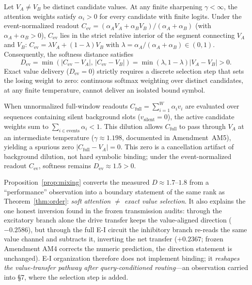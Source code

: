 \begin{proposition}
\label{prop:mixing}
Let $V_A \neq V_B$ be distinct candidate values. At any finite sharpening $\gamma<\infty$,
the attention weights satisfy $\alpha_i>0$ for every candidate with finite logits.
Under the event-normalized readout $C_{\mathrm{ev}} = (\alpha_A V_A + \alpha_B V_B)/(\alpha_A + \alpha_B)$
(with $\alpha_A+\alpha_B>0$), $C_{\mathrm{ev}}$ lies in the strict relative interior of the segment
connecting $V_A$ and $V_B$: $C_{\mathrm{ev}} = \lambda V_A + (1-\lambda)V_B$ with
$\lambda = \alpha_A/(\alpha_A+\alpha_B) \in (0, 1)$. Consequently, the softness distance satisfies
\begin{equation}
D_{\mathrm{ev}} = \min(|C_{\mathrm{ev}}-V_A|,\, |C_{\mathrm{ev}}-V_B|) = \min(\lambda, 1-\lambda)|V_A - V_B| > 0.
\end{equation}
Exact value delivery ($D_{\mathrm{ev}}=0$) strictly requires a discrete selection step that sets the
losing weight to zero: continuous softmax weighting over distinct candidates, at any finite temperature,
cannot deliver an isolated bound symbol.
\end{proposition}

\begin{remark}
\label{rem:cancellation}
When unnormalized full-window readouts $C_{\mathrm{full}} = \sum_{i=1}^W \alpha_i v_i$ are evaluated over
sequences containing silent background slots ($v_{\mathrm{silent}}=0$), the active candidate weights sum to
$\sum_{i\in\mathrm{events}}\alpha_i < 1$. This dilution allows $C_{\mathrm{full}}$ to pass through $V_A$
at an intermediate temperature ($\gamma \approx 1.198$, documented in Amendment~AM5), yielding a spurious
zero $|C_{\mathrm{full}} - V_A| = 0$. This zero is a cancellation artifact of background dilution, not hard
symbolic binding; under the event-normalized readout $C_{\mathrm{ev}}$, softness remains $D_{\mathrm{ev}} \approx 1.5 > 0$.
\end{remark}

Proposition~\ref{prop:mixing} converts the measured
$D\approx1.7$--$1.8$ from a ``performance'' observation into a boundary
statement of the same rank as Theorem~\ref{thm:order}: \emph{soft attention
$\neq$ exact value selection}. It also explains the one honest inversion
found in the frozen transmission audits: through the excitatory branch
alone the drive transfer keeps the value-aligned direction
($-0.2586$), but through the full E-I circuit the inhibitory branch
re-reads the same value channel and subtracts it, inverting the net
transfer ($+0.2367$; frozen Amendment AM4 corrects the numeric prediction,
the direction statement is unchanged). E-I organization therefore does not
implement binding; it \emph{reshapes the value-transfer pathway after
query-conditioned routing}---an observation carried into §7, where the
selection step is added.


